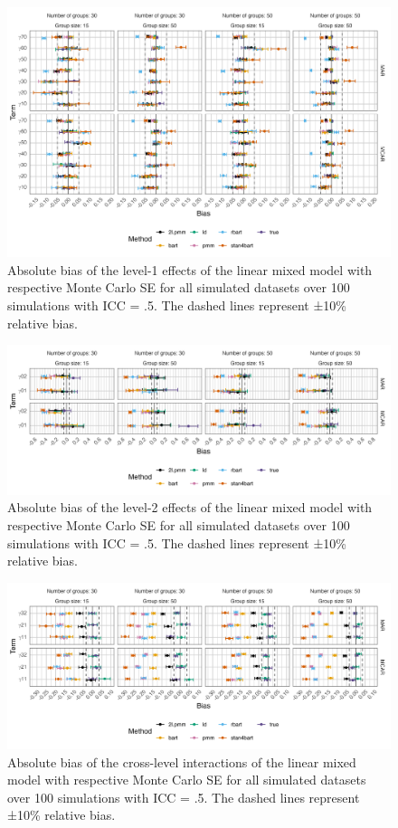 \documentclass[3p,12pt,a4paper]{elsarticle}
\begin{document}
\begin{figure}[H]
    \centering 
    \includegraphics[width=1\textwidth]{biaslevel1.png}
    \caption{Absolute bias of the level-1 effects of the linear mixed model with respective Monte Carlo SE for all simulated datasets over 100 simulations with ICC = .5. The dashed lines represent ±10\% relative bias.}
    \label{fig:biaslevel1}
\end{figure}

\begin{figure}[H]
    \centering
    \includegraphics[width=1\textwidth]{biaslevel2.png}
    \caption{Absolute bias of the level-2 effects of the linear mixed model with respective Monte Carlo SE for all simulated datasets over 100 simulations with ICC = .5. The dashed lines represent ±10\% relative bias.}
    \label{fig:biaslevel2}
\end{figure}

\begin{figure}[H]
    \centering
    \includegraphics[width=1\textwidth]{biascrosslevel.png}
    \caption{Absolute bias of the cross-level interactions of the linear mixed model with respective Monte Carlo SE for all simulated datasets over 100 simulations with ICC = .5. The dashed lines represent ±10\% relative bias.}
    \label{fig:biascrosslevel}
\end{figure}
\end{document}
